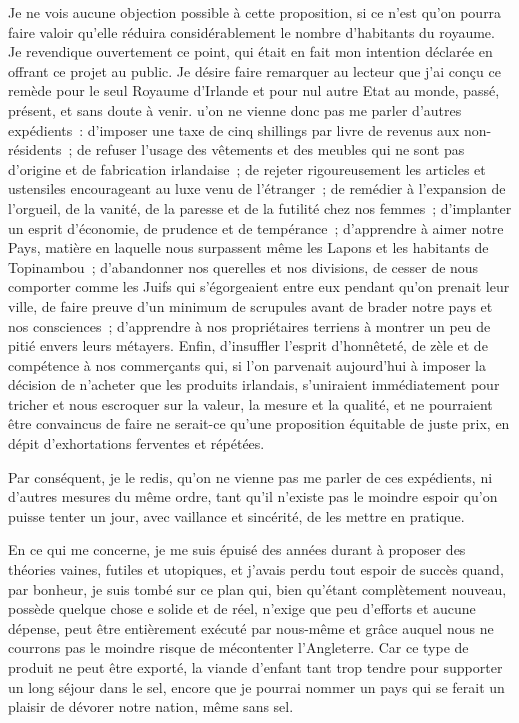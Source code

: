\documentclass[french,twoside]{book} %
\begin{document}
Je ne vois aucune objection possible à cette proposition, si ce n’est qu’on pourra faire valoir qu’elle réduira considérablement le nombre d’habitants du royaume. Je revendique ouvertement ce point, qui était en fait mon intention déclarée en offrant ce projet au public. Je désire faire remarquer au lecteur que j’ai conçu ce remède pour le seul Royaume d’Irlande et pour nul autre Etat au monde, passé, présent, et sans doute à venir. u’on ne vienne donc pas me parler d’autres expédients : d’imposer une taxe de cinq shillings par livre de revenus aux non-résidents ; de refuser l’usage des vêtements et des meubles qui ne sont pas d’origine et de fabrication irlandaise ; de rejeter rigoureusement les articles et ustensiles encourageant au luxe venu de l’étranger ; de remédier à l’expansion de l’orgueil, de la vanité, de la paresse et de la futilité chez nos femmes ; d’implanter un esprit d’économie, de prudence et de tempérance ; d’apprendre à aimer notre Pays, matière en laquelle nous surpassent même les Lapons et les habitants de Topinambou ; d’abandonner nos querelles et nos divisions, de cesser de nous comporter comme les Juifs qui s’égorgeaient entre eux pendant qu’on prenait leur ville, de faire preuve d’un minimum de scrupules avant de brader notre pays et nos consciences ; d’apprendre à nos propriétaires terriens à montrer un peu de pitié envers leurs métayers. Enfin, d’insuffler l’esprit d’honnêteté, de zèle et de compétence à nos commerçants qui, si l’on parvenait aujourd’hui à imposer la décision de n’acheter que les produits irlandais, s’uniraient immédiatement pour tricher et nous escroquer sur la valeur, la mesure et la qualité, et ne pourraient être convaincus de faire ne serait-ce qu’une proposition équitable de juste prix, en dépit d’exhortations ferventes et répétées.\par
Par conséquent, je le redis, qu’on ne vienne pas me parler de ces expédients, ni d’autres mesures du même ordre, tant qu’il n’existe pas le moindre espoir qu’on puisse tenter un jour, avec vaillance et sincérité, de les mettre en pratique.\par
En ce qui me concerne, je me suis épuisé des années durant à proposer des théories vaines, futiles et utopiques, et j’avais perdu tout espoir de succès quand, par bonheur, je suis tombé sur ce plan qui, bien qu’étant complètement nouveau, possède quelque chose e solide et de réel, n’exige que peu d’efforts et aucune dépense, peut être entièrement exécuté par nous-même et grâce auquel nous ne courrons pas le moindre risque de mécontenter l’Angleterre. Car ce type de produit ne peut être exporté, la viande d’enfant tant trop tendre pour supporter un long séjour dans le sel, encore que je pourrai nommer un pays qui se ferait un plaisir de dévorer notre nation, même sans sel.\par
\end{document}
